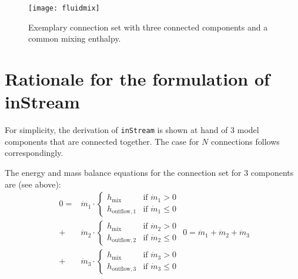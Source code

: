 \begin{figure}[H]
  \begin{center}
    \texttt{[image: fluidmix]}
  \end{center}
  \caption{Exemplary connection set with three connected components and a common mixing enthalpy.}
\end{figure}

\section{Rationale for the formulation of inStream}\label{rationale-for-the-formulation-of-the-instream-operator}

For simplicity, the derivation of \lstinline!inStream! is shown at hand of 3 model components that are connected together.
The case for $N$ connections follows correspondingly.

The energy and mass balance equations for the connection set for 3
components are (see above):
\begin{subequations}
\begin{equation}
\begin{split}
0=&\dot{m}_1\cdot
\begin{cases}
h_{\mathrm{mix}}&\text{if $\dot{m}_1 > 0$}\\
h_{\mathrm{outflow},1}&\text{if $\dot{m}_1 \leq 0$}
\end{cases}\\
+&\dot{m}_2\cdot
\begin{cases}
h_{\mathrm{mix}}&\text{if $\dot{m}_2 > 0$}\\
h_{\mathrm{outflow},2}&\text{if $\dot{m}_2 \leq 0$}
\end{cases}\\
+&\dot{m}_3\cdot
\begin{cases}
h_{\mathrm{mix}}&\text{if $\dot{m}_3 > 0$}\\
h_{\mathrm{outflow},3}&\text{if $\dot{m}_3 \leq 0$}
\end{cases}
\end{split}
\label{eq:D1a}
\end{equation}
\begin{equation}
0=\dot{m}_1+\dot{m}_2+\dot{m}_3
\label{eq:D1b}
\end{equation}
\label{eq:D1}
\end{subequations}

